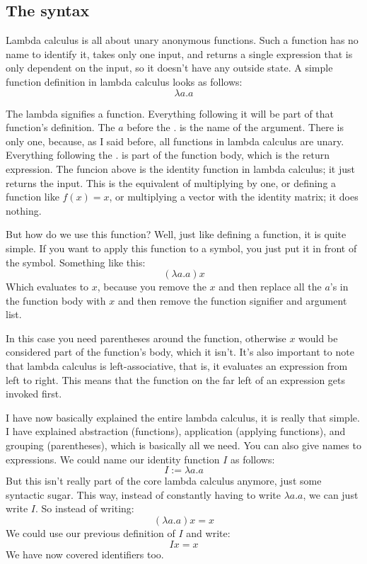 \documentclass[a4paper]{article}
\begin{document}
\subsection{The syntax}

Lambda calculus is all about unary anonymous functions. Such a function has no
name to identify it, takes only one input, and returns a single expression that
is only dependent on the input, so it doesn't have any outside state. A simple
function definition in lambda calculus looks as follows:
\[\lambda a.a\]

The lambda signifies a function. Everything following it will be part of that
function's definition. The \(a\) before the \(.\) is the name of the argument.
There is only one, because, as I said before, all functions in lambda calculus
are unary. Everything following the \(.\) is part of the function body, which
is the return expression. The funcion above is the identity function in lambda
calculus; it just returns the input. This is the equivalent of multiplying by
one, or defining a function like \(f(x)=x\), or multiplying a vector with the
identity matrix; it does nothing.

But how do we use this function? Well, just like defining a function, it is
quite simple. If you want to apply this function to a symbol, you just put it
in front of the symbol. Something like this:
\[(\lambda a.a)x\]
Which evaluates to \(x\), because you remove the \(x\) and then replace all the
\(a\)'s in the function body with \(x\) and then remove the function signifier
and argument list.

In this case you need parentheses around the function, otherwise \(x\) would be
considered part of the function's body, which it isn't. It's also important to
note that lambda calculus is left-associative, that is, it evaluates an
expression from left to right. This means that the function on the far left of
an expression gets invoked first.

I have now basically explained the entire lambda calculus, it is really that
simple. I have explained abstraction (functions), application (applying
functions), and grouping (parentheses), which is basically all we need. You
can also give names to expressions. We could name our identity function \(I\)
as follows: \[I:=\lambda a.a\] But this isn't really part of the core lambda
calculus anymore, just some syntactic sugar. This way, instead of constantly
having to write \(\lambda a.a\), we can just write \(I\). So instead of
writing: \[(\lambda a.a)x=x\] We could use our previous definition of \(I\) and
write: \[Ix=x\] We have now covered identifiers too.
\end{document}
